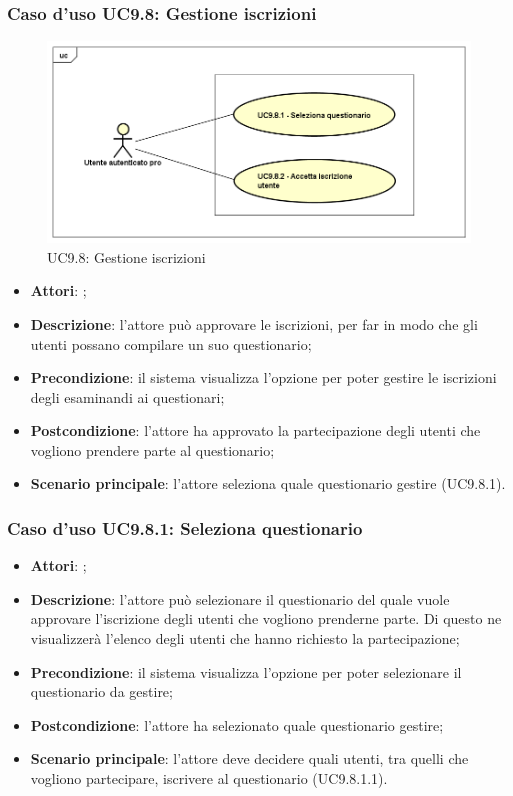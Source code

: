 	 \subsubsection{Caso d'uso UC9.8: Gestione iscrizioni}
	 \label{UC9.8}
	 \begin{figure}[h]
	 	\centering
	 	\includegraphics[scale=0.5,keepaspectratio]{UML/UC9_8.png}
	 	\caption{UC9.8: Gestione iscrizioni}
	 \end{figure}
	 \FloatBarrier
	 \begin{itemize}
	 	\item \textbf{Attori}: \uaupro{};
	 	\item \textbf{Descrizione}: l'attore può approvare le iscrizioni, per far in modo che gli utenti possano compilare un suo questionario;
	 	\item \textbf{Precondizione}: il sistema visualizza l'opzione per poter gestire le iscrizioni degli esaminandi ai questionari;
	 	\item \textbf{Postcondizione}: l'attore ha approvato la partecipazione degli utenti che vogliono prendere parte al questionario;
	 	\item \textbf{Scenario principale}: l'attore seleziona quale questionario gestire (UC9.8.1).
	 \end{itemize}
	 
		 \subsubsection{Caso d'uso UC9.8.1: Seleziona questionario}
		 \label{UC9.8.1}
		 \begin{itemize}
		 	\item \textbf{Attori}: \uaupro{};
		 	\item \textbf{Descrizione}: l'attore può selezionare il questionario del quale vuole approvare l'iscrizione degli utenti che vogliono prenderne parte. Di questo ne visualizzerà l'elenco degli utenti che hanno richiesto la partecipazione; 
		 	\item \textbf{Precondizione}: il sistema visualizza l'opzione per poter selezionare il questionario da gestire;
		 	\item \textbf{Postcondizione}: l'attore ha selezionato quale questionario gestire;
		 	\item \textbf{Scenario principale}: l'attore deve decidere quali utenti, tra quelli che vogliono partecipare, iscrivere al questionario (UC9.8.1.1).
		 \end{itemize}
		 
